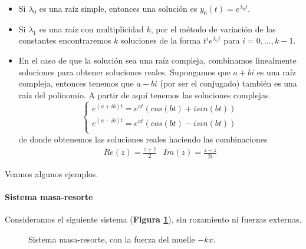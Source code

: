 \begin{itemize}
\item Si $λ_0$ es una raíz simple, entonces una solución es $y_0(t) = e^{λ_0t}$.
\item Si $λ_1$ es una raíz con multiplicidad $k$, por el método de variación de las constantes encontraremos $k$ soluciones de la forma $t^ie^{λ_1t}$ para $i=0,\hdots,k-1$.
\item En el caso de que la solución sea una raíz compleja, combinamos linealmente soluciones para obtener soluciones reales.
Supongamos que $a+bi$ es una raíz compleja, entonces tenemos que $a-bi$ (por ser el conjugado) también es una raíz del polinomio. A partir de aquí tenemos las soluciones complejas \begin{equation}
\left\lbrace \begin{array}{l}
e^{(a+ib)t} = e^{at}(cos(bt)+isin(bt))\\
e^{(a-ib)t} = e^{at}(cos(bt)-isin(bt))\\
\end{array}\right. 
\end{equation}
de donde obtenemos las soluciones reales haciendo las combinaciones
$$\begin{array}{c|c}
Re(z) = \frac{z+\bar{z}}{2} & Im(z) = \frac{z-\bar{z}}{2i}
\end{array}$$
\end{itemize}

Veamos algunos ejemplos.

\paragraph{Sistema masa-resorte}

Consideramos el siguiente sistema (\textbf{Figura \ref{imgMasaResorte1}}), sin rozamiento ni fuerzas externas.

\begin{figure}[hbtp]
\centering
{}
\caption{Sistema masa-resorte, con la fuerza del muelle $-kx$.}
\label{imgMasaResorte1}
\end{figure}

